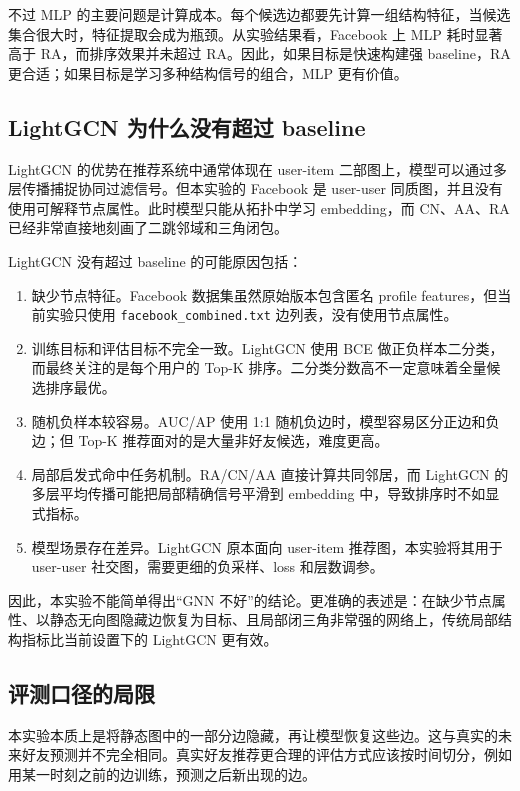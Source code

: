 \documentclass[UTF8,zihao=-4]{ctexart}
\begin{document}
不过 MLP 的主要问题是计算成本。每个候选边都要先计算一组结构特征，当候选集合很大时，特征提取会成为瓶颈。从实验结果看，Facebook 上 MLP 耗时显著高于 RA，而排序效果并未超过 RA。因此，如果目标是快速构建强 baseline，RA 更合适；如果目标是学习多种结构信号的组合，MLP 更有价值。

\subsection{LightGCN 为什么没有超过 baseline}

LightGCN 的优势在推荐系统中通常体现在 user-item 二部图上，模型可以通过多层传播捕捉协同过滤信号。但本实验的 Facebook 是 user-user 同质图，并且没有使用可解释节点属性。此时模型只能从拓扑中学习 embedding，而 CN、AA、RA 已经非常直接地刻画了二跳邻域和三角闭包。

LightGCN 没有超过 baseline 的可能原因包括：
\begin{enumerate}
  \item 缺少节点特征。Facebook 数据集虽然原始版本包含匿名 profile features，但当前实验只使用 \texttt{facebook\_combined.txt} 边列表，没有使用节点属性。
  \item 训练目标和评估目标不完全一致。LightGCN 使用 BCE 做正负样本二分类，而最终关注的是每个用户的 Top-K 排序。二分类分数高不一定意味着全量候选排序最优。
  \item 随机负样本较容易。AUC/AP 使用 1:1 随机负边时，模型容易区分正边和负边；但 Top-K 推荐面对的是大量非好友候选，难度更高。
  \item 局部启发式命中任务机制。RA/CN/AA 直接计算共同邻居，而 LightGCN 的多层平均传播可能把局部精确信号平滑到 embedding 中，导致排序时不如显式指标。
  \item 模型场景存在差异。LightGCN 原本面向 user-item 推荐图，本实验将其用于 user-user 社交图，需要更细的负采样、loss 和层数调参。
\end{enumerate}

因此，本实验不能简单得出“GNN 不好”的结论。更准确的表述是：在缺少节点属性、以静态无向图隐藏边恢复为目标、且局部闭三角非常强的网络上，传统局部结构指标比当前设置下的 LightGCN 更有效。

\subsection{评测口径的局限}

本实验本质上是将静态图中的一部分边隐藏，再让模型恢复这些边。这与真实的未来好友预测并不完全相同。真实好友推荐更合理的评估方式应该按时间切分，例如用某一时刻之前的边训练，预测之后新出现的边。
\end{document}
